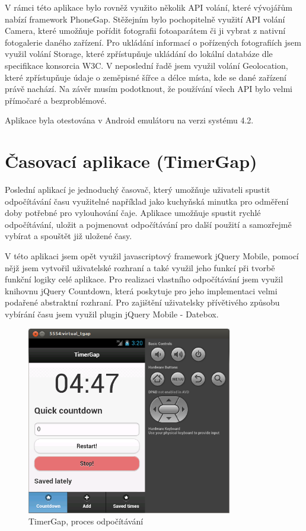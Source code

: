 V rámci této aplikace bylo rovněž využito několik API volání, které vývojářům nabízí framework PhoneGap. Stěžejním bylo pochopitelně využití API volání Camera, které umožňuje pořídit fotografii fotoaparátem či ji vybrat z nativní fotogalerie daného zařízení. Pro ukládání informací o pořízených fotografiích jsem využil volání Storage, které zpřístupňuje ukládání do lokální databáze dle specifikace konsorcia W3C. V neposlední řadě jsem využil volání Geolocation, které zpřístupňuje údaje o zeměpisné šířce a délce místa, kde se dané zařízení právě nachází. Na závěr musím podotknout, že používání všech API bylo velmi přímočaré a bezproblémové.

Aplikace byla otestována v Android emulátoru na verzi systému 4.2.

\section{Časovací aplikace (TimerGap)}
Poslední aplikací je jednoduchý časovač, který umožňuje uživateli spustit odpočítávání času využitelné například jako kuchyňská minutka pro odměření doby potřebné pro vylouhování čaje. Aplikace umožňuje spustit rychlé odpočítávání, uložit a pojmenovat odpočítávání pro další použití a samozřejmě vybírat a spouštět již uložené časy.

V této aplikaci jsem opět využil javascriptový framework jQuery Mobile, pomocí nějž jsem vytvořil uživatelské rozhraní a také využil jeho funkcí při tvorbě funkční logiky celé aplikace. Pro realizaci vlastního odpočítávání jsem využil knihovnu jQuery Countdown, která poskytuje pro jeho implementaci velmi podařené abstraktní rozhraní. Pro zajištění uživatelsky přívětivého způsobu vybírání času jsem využil plugin jQuery Mobile - Datebox.

\begin{figure}[H]\centering
\includegraphics[width=0.8\textwidth]{tgap_odpocitavani.png}
\caption{TimerGap, proces odpočítávání}
\label{fig:TGapOdpocitavani}
\end{figure}

